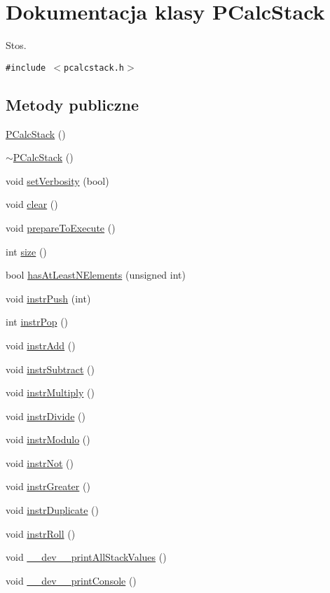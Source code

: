 \hypertarget{classPCalcStack}{
\section{Dokumentacja klasy PCalcStack}
\label{classPCalcStack}
}
Stos.  


{\tt \#include $<$pcalcstack.h$>$}

\subsection*{Metody publiczne}
\begin{CompactItemize}
\item 
\hyperlink{classPCalcStack_cc7266cec193eaee5770560743e0b4f2}{PCalcStack} ()
\item 
\hyperlink{classPCalcStack_0576403e030755933fa56263aed99765}{$\sim$PCalcStack} ()
\item 
void \hyperlink{classPCalcStack_6a831a20f4dec457de9f880202cf2e33}{setVerbosity} (bool)
\item 
void \hyperlink{classPCalcStack_7b1abd7a77db664dcf9e0bd56c17301f}{clear} ()
\item 
void \hyperlink{classPCalcStack_b3129921fea95a4df231201e2601e1c0}{prepareToExecute} ()
\item 
int \hyperlink{classPCalcStack_e334a37c1749b028e75e0d251afe47f7}{size} ()
\item 
bool \hyperlink{classPCalcStack_39d4d9e53e8b57fa934ee1a5b9171dc8}{hasAtLeastNElements} (unsigned int)
\item 
void \hyperlink{classPCalcStack_269ca0f8f0a4395a0035fa0a9bc813a1}{instrPush} (int)
\item 
int \hyperlink{classPCalcStack_796ba40ffc60b05a8a116d881aa2e37f}{instrPop} ()
\item 
void \hyperlink{classPCalcStack_04ef30536acac1b02093153f1cb83353}{instrAdd} ()
\item 
void \hyperlink{classPCalcStack_a35493e8dc971fc2f47a113a6d400784}{instrSubtract} ()
\item 
void \hyperlink{classPCalcStack_0d2b0b03f9a14c875364d4a5dabb6d7a}{instrMultiply} ()
\item 
void \hyperlink{classPCalcStack_f642cacff51d21c2f25487dae1a5b84c}{instrDivide} ()
\item 
void \hyperlink{classPCalcStack_bda10d125ac0b2dee9398ce185435fdb}{instrModulo} ()
\item 
void \hyperlink{classPCalcStack_5fe0eb9337f3e18416e02c082c14dc66}{instrNot} ()
\item 
void \hyperlink{classPCalcStack_b656cedeb6038c6e3af6e01df21d8c1b}{instrGreater} ()
\item 
void \hyperlink{classPCalcStack_0424a6bcacc8bee1a5ff074dea87be1e}{instrDuplicate} ()
\item 
void \hyperlink{classPCalcStack_1be80d765fdc530467d76594d94c6746}{instrRoll} ()
\item 
void \hyperlink{classPCalcStack_e28932817d21f528cb3ebe06471df9a2}{\_\-\_\-dev\_\-\_\-printAllStackValues} ()
\item 
void \hyperlink{classPCalcStack_dbfaddfaadb912324c965390a70ae323}{\_\-\_\-dev\_\-\_\-printConsole} ()
\end{CompactItemize}
